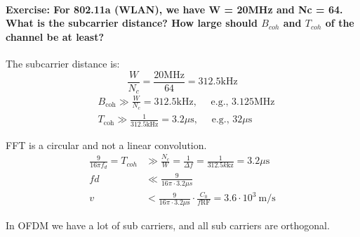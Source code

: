 \paragraph{Exercise: For 802.11a (WLAN), we have W = 20MHz and Nc = 64. What is the subcarrier distance? How large should $B_{coh}$ and $T_{coh}$ of the channel be at least?}\mbox{}\newline
The subcarrier distance is:
$$
\frac{W}{N_c}=\frac{20 \mathrm{MHz}}{64}=312.5 \mathrm{kHz}
$$
$$
\begin{aligned}
&B_{\mathrm{coh}} \gg \frac{W}{N_c}=312.5 \mathrm{kHz}, \quad \text { e.g., } 3.125 \mathrm{MHz} \\
&T_{\mathrm{coh}} \gg \frac{1}{312.5 \mathrm{kHz}}=3.2 \mu \mathrm{s}, \quad \text { e.g., } 32 \mu \mathrm{s}
\end{aligned}
$$

FFT is a circular and not a linear convolution.
$$
\begin{aligned}
\frac{9}{16 \pi f_d}=T_{c o h} & \gg \frac{N_c}{W}=\frac{1}{\Delta f}=\frac{1}{312.5 k \mathrm{kz}}=3.2 \mu \mathrm{s} \\
f d & \ll \frac{9}{16 \pi \cdot 3.2 \mu s} \\
v &<\frac{9}{16 \pi \cdot 3.2 \mu \mathrm{s}} \cdot \frac{C_0}{f \mathrm{RF}}=3.6 \cdot 10^3 \mathrm{~m} / \mathrm{s}
\end{aligned}
$$

In OFDM we have a lot of sub carriers, and all sub carriers are orthogonal.
